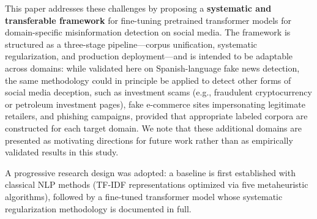 \documentclass[informatics,article,submit,pdftex,moreauthors]{Definitions/mdpi}
\begin{document}
This paper addresses these challenges by proposing a \textbf{systematic and transferable framework} for fine-tuning pretrained transformer models for domain-specific misinformation detection on social media. The framework is structured as a three-stage pipeline—corpus unification, systematic regularization, and production deployment—and is intended to be adaptable across domains: while validated here on Spanish-language fake news detection, the same methodology could in principle be applied to detect other forms of social media deception, such as investment scams (e.g., fraudulent cryptocurrency or petroleum investment pages), fake e-commerce sites impersonating legitimate retailers, and phishing campaigns, provided that appropriate labeled corpora are constructed for each target domain. We note that these additional domains are presented as motivating directions for future work rather than as empirically validated results in this study.

A progressive research design was adopted: a baseline is first established with classical NLP methods (TF-IDF representations optimized via five metaheuristic algorithms), followed by a fine-tuned transformer model whose systematic regularization methodology is documented in full.
\end{document}

